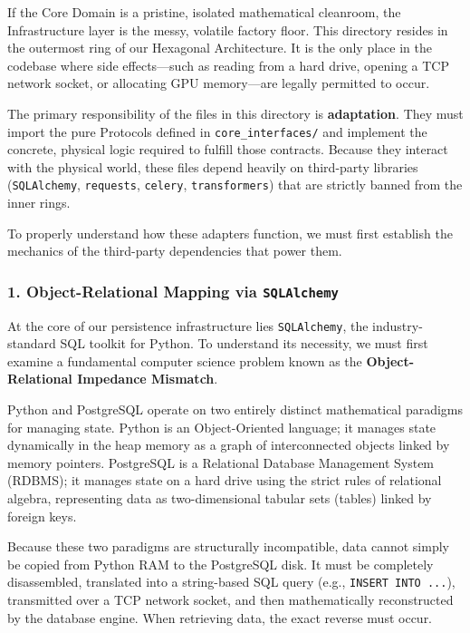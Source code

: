 
If the Core Domain is a pristine, isolated mathematical cleanroom, the Infrastructure layer is the messy, volatile factory floor. This directory resides in the outermost ring of our Hexagonal Architecture. It is the only place in the codebase where side effects---such as reading from a hard drive, opening a TCP network socket, or allocating GPU memory---are legally permitted to occur.

The primary responsibility of the files in this directory is \textbf{adaptation}. They must import the pure Protocols defined in \texttt{core\_interfaces/} and implement the concrete, physical logic required to fulfill those contracts. Because they interact with the physical world, these files depend heavily on third-party libraries (\texttt{SQLAlchemy}, \texttt{requests}, \texttt{celery}, \texttt{transformers}) that are strictly banned from the inner rings.

To properly understand how these adapters function, we must first establish the mechanics of the third-party dependencies that power them.


\subsubsection*{1. Object-Relational Mapping via \texttt{SQLAlchemy}}

At the core of our persistence infrastructure lies \texttt{SQLAlchemy}, the industry-standard SQL toolkit for Python. To understand its necessity, we must first examine a fundamental computer science problem known as the \textbf{Object-Relational Impedance Mismatch}.

Python and PostgreSQL operate on two entirely distinct mathematical paradigms for managing state. Python is an Object-Oriented language; it manages state dynamically in the heap memory as a graph of interconnected objects linked by memory pointers. PostgreSQL is a Relational Database Management System (RDBMS); it manages state on a hard drive using the strict rules of relational algebra, representing data as two-dimensional tabular sets (tables) linked by foreign keys.

Because these two paradigms are structurally incompatible, data cannot simply be copied from Python RAM to the PostgreSQL disk. It must be completely disassembled, translated into a string-based SQL query (e.g., \texttt{INSERT INTO ...}), transmitted over a TCP network socket, and then mathematically reconstructed by the database engine. When retrieving data, the exact reverse must occur.

